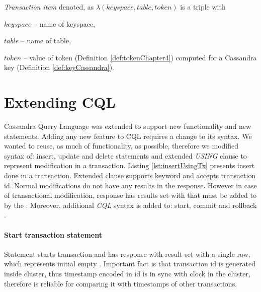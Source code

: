 \begin{definition}
\label{def:transactionItemChapter4}
\emph{Transaction item} denoted, as $\lambda(\mathit{keyspace}, \mathit{table}, \mathit{token})$ is a triple with \begin{enumerate*}[label=\alph*)]
\item $\mathit{keyspace}$ -- name of keyspace,
\item $\mathit{table}$ -- name of table,
\item $\mathit{token}$ -- value of token (Definition \ref{def:tokenChapter4}) computed for a Cassandra key (Definition \ref{def:keyCassandra}).
\end{enumerate*}
\end{definition}






\section{Extending CQL}
Cassandra Query Language was extended to support new functionality and new statements. Adding any new feature to CQL requires a change to its syntax. We wanted to reuse, as much of functionality, as possible, therefore we modified syntax of: insert, update and delete statements and extended \emph{USING} clause to represent modification in a transaction. Listing \ref{lst:insertUsingTx} presents insert done in a transaction. Extended  clause supports  keyword and accepts transaction id. Normal modifications do not have any results in the response. However in case of transactional modification, response has results set with \txItem that must be added to \txState by the \client. Moreover, additional \emph{CQL} syntax is added to: start, commit and rollback \transaction.

\paragraph{Start transaction statement} 
Statement starts transaction and has response with result set with a single row, which represents initial empty \txState. 
 Important fact is that transaction id is generated inside cluster, thus timestamp encoded in id is in sync with clock in the cluster, therefore is reliable for comparing it with timestamps of other transactions.

